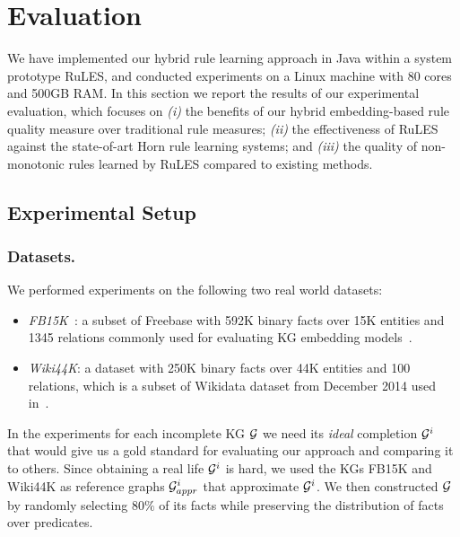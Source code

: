 
\section{Evaluation}
We have implemented our hybrid rule learning approach in Java within a system prototype RuLES,
and conducted experiments on a Linux machine with 80 cores and 500GB RAM.
In this section we report the results of our experimental evaluation, which focuses on 
\emph{(i)} the benefits of our hybrid embedding-based rule quality measure over traditional rule measures; 
\emph{(ii)} the effectiveness of RuLES against the state-of-art Horn rule learning systems; and 
\emph{(iii)} the quality of non-monotonic rules learned by RuLES compared to existing methods.

\subsection{Experimental Setup}
\label{sec:exper_setup}

\subsubsection{Datasets.}
We performed experiments on the following two real world datasets: 
\begin{itemize}
\item \textit{FB15K}~\cite{Bordes:NIPS2013}: a subset of Freebase with 592K binary facts over 15K entities and 1345 relations
commonly used for evaluating KG embedding models~\cite{DBLP:journals/tkde/WangMWG17}.
\item \textit{Wiki44K}: a dataset with 250K binary facts over 44K entities and 100 relations, which is a subset of 
Wikidata dataset from December 2014
used in~\cite{amie}.
\end{itemize}

In the experiments for each incomplete KG $\mathcal{G}$ we need its \emph{ideal} completion $\mathcal{G}^i$ that would give us a gold standard for evaluating our approach and comparing it to others.
Since obtaining a real life $\mathcal{G}^i$ is hard, we used the KGs FB15K 
and Wiki44K as reference graphs $\mathcal{G}^i_{appr}$ that approximate $\mathcal{G}^i$. 
We then constructed $\mathcal{G}$ by randomly selecting $80\%$ of its facts while preserving the distribution of facts over predicates.

